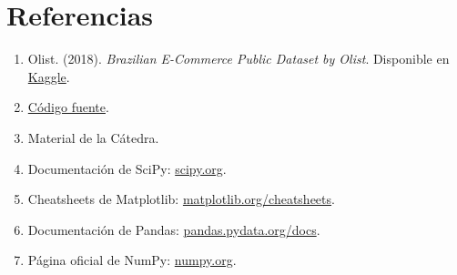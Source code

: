 \documentclass[12pt,a4paper,twoside]{article}
\begin{document}
\section{Referencias}

\begin{enumerate}
    \item Olist. (2018). \textit{Brazilian E-Commerce Public Dataset by Olist}. Disponible en \href{https://www.kaggle.com/olistbr/brazilian-ecommerce}{Kaggle}.
    \item \href{https://github.com/Stefano-Mazziotta/probability-and-statistic-project/blob/master/main.py}{Código fuente}.
    \item Material de la Cátedra.
    \item Documentación de SciPy: \href{https://scipy.org/}{scipy.org}.
    \item Cheatsheets de Matplotlib: \href{https://matplotlib.org/cheatsheets/}{matplotlib.org/cheatsheets}.
    \item Documentación de Pandas: \href{https://pandas.pydata.org/docs/index.html}{pandas.pydata.org/docs}.
    \item Página oficial de NumPy: \href{https://numpy.org/}{numpy.org}.
\end{enumerate}
\end{document}
